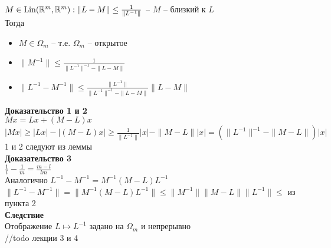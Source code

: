 \documentclass[12pt]{article}
\DeclareMathOperator{\Lin}{Lin}
\begin{document}
$M \in \Lin(\Rset^m, \Rset^m): \|L-M\| \leq \frac1{\|L^{-1}\|}$ -- $M$ -- близкий к $L$\\
Тогда
\begin{itemize}
    \item $M \in \Omega_m$ -- т.е. $\Omega_m$ -- открытое
    \item $\|M^{-1}\| \leq \frac1{\|L^{-1}\|^{-1} - \|L-M\|}$
    \item $\|L^{-1}-M^{-1}\| \leq \frac{\|L^{-1}\|}{\|L^{-1}\|^{-1}-\|L-M\|}\|L-M\|$
\end{itemize}
\textbf{Доказательство 1 и 2}\\
$Mx = Lx + (M-L)x$\\
$|Mx| \geq |Lx| - |(M-L)x| \geq \frac1{\|L^{-1}\|}|x| -\|M-L\||x| = (\|L^{-1}\|^{-1}-\|M-L\|)|x|$\\ 
1 и 2 следуют из леммы\\
\textbf{Доказательство 3}\\
$\frac1l - \frac1m = \frac{m-l}{lm}$\\
Аналогично $L^{-1}-M^{-1} = M^{-1}(M-L)L^{-1}$\\
$\|L^{-1}-M^{-1}\| = \|M^{-1}(M-L)L^{-1}\| \leq \|M^{-1}\|\|M-L\|\|L^{-1}\| \leq $ из пункта 2\\
\textbf{Следствие}\\
Отображение $L \mapsto L^{-1}$ задано на $\Omega_m$ и непрерывно\\
//todo лекции 3 и 4
\end{document}
